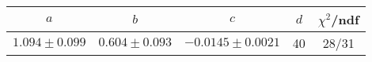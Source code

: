 \begin{tabular}{c|c|c|c|c}
$a$ & $b$ & $c$ & $d$ & $\chi^2$/ndf \\
\hline
$1.094\pm0.099$ & $0.604\pm0.093$ & $-0.0145\pm0.0021$ & 40 & 28/31
\end{tabular}
